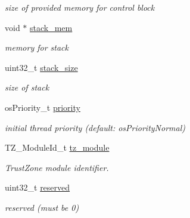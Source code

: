 \begin{DoxyCompactItemize}
\begin{DoxyCompactList}\small\item\em size of provided memory for control block \end{DoxyCompactList}\item 
\mbox{\label{structos_thread_attr__t_a8ce05e5336d40cba01b6e1d1e36afe77}} 
void $\ast$ \mbox{\hyperlink{structos_thread_attr__t_a8ce05e5336d40cba01b6e1d1e36afe77}{stack\+\_\+mem}}
\begin{DoxyCompactList}\small\item\em memory for stack \end{DoxyCompactList}\item 
\mbox{\label{structos_thread_attr__t_acb537dae7fecd9c744852ff6d6ea2c04}} 
uint32\+\_\+t \mbox{\hyperlink{structos_thread_attr__t_acb537dae7fecd9c744852ff6d6ea2c04}{stack\+\_\+size}}
\begin{DoxyCompactList}\small\item\em size of stack \end{DoxyCompactList}\item 
\mbox{\label{structos_thread_attr__t_a90ae74b20698ee175b68f7f53a0b9091}} 
os\+Priority\+\_\+t \mbox{\hyperlink{structos_thread_attr__t_a90ae74b20698ee175b68f7f53a0b9091}{priority}}
\begin{DoxyCompactList}\small\item\em initial thread priority (default\+: os\+Priority\+Normal) \end{DoxyCompactList}\item 
\mbox{\label{structos_thread_attr__t_a5cefc38447dae2c9f3fb81c193c49536}} 
T\+Z\+\_\+\+Module\+Id\+\_\+t \mbox{\hyperlink{structos_thread_attr__t_a5cefc38447dae2c9f3fb81c193c49536}{tz\+\_\+module}}
\begin{DoxyCompactList}\small\item\em Trust\+Zone module identifier. \end{DoxyCompactList}\item 
\mbox{\label{structos_thread_attr__t_a553fd9961d8f9e4562f84cd68709ae2d}} 
uint32\+\_\+t \mbox{\hyperlink{structos_thread_attr__t_a553fd9961d8f9e4562f84cd68709ae2d}{reserved}}
\begin{DoxyCompactList}\small\item\em reserved (must be 0) \end{DoxyCompactList}\end{DoxyCompactItemize}


